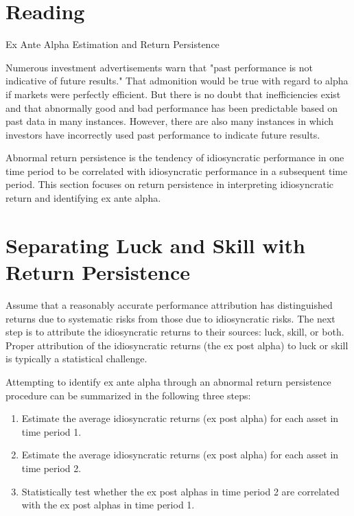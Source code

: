 \documentclass[11pt]{article}
\begin{document}
\section*{Reading}
Ex Ante Alpha Estimation and Return Persistence

Numerous investment advertisements warn that "past performance is not indicative of future results." That admonition would be true with regard to alpha if markets were perfectly efficient. But there is no doubt that inefficiencies exist and that abnormally good and bad performance has been predictable based on past data in many instances. However, there are also many instances in which investors have incorrectly used past performance to indicate future results.

Abnormal return persistence is the tendency of idiosyncratic performance in one time period to be correlated with idiosyncratic performance in a subsequent time period. This section focuses on return persistence in interpreting idiosyncratic return and identifying ex ante alpha.

\section*{Separating Luck and Skill with Return Persistence}
Assume that a reasonably accurate performance attribution has distinguished returns due to systematic risks from those due to idiosyncratic risks. The next step is to attribute the idiosyncratic returns to their sources: luck, skill, or both. Proper attribution of the idiosyncratic returns (the ex post alpha) to luck or skill is typically a statistical challenge.

Attempting to identify ex ante alpha through an abnormal return persistence procedure can be summarized in the following three steps:

\begin{enumerate}
  \item Estimate the average idiosyncratic returns (ex post alpha) for each asset in time period 1.

  \item Estimate the average idiosyncratic returns (ex post alpha) for each asset in time period 2.

  \item Statistically test whether the ex post alphas in time period 2 are correlated with the ex post alphas in time period 1.

\end{enumerate}
\end{document}
